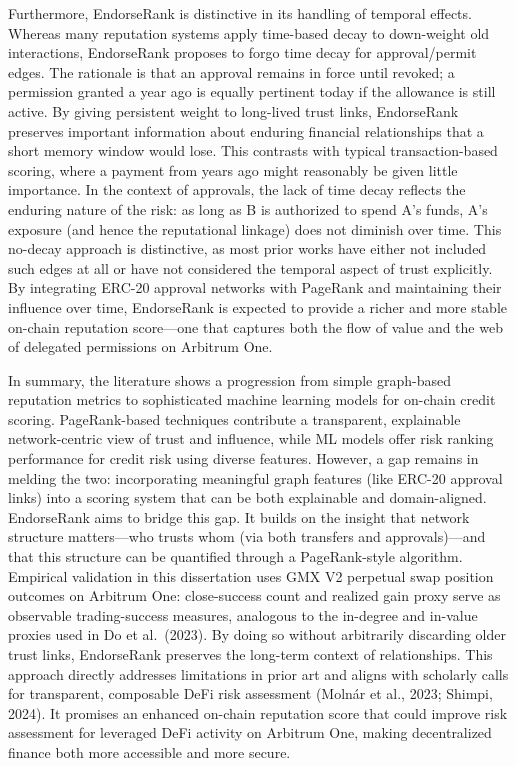 Furthermore, EndorseRank is distinctive in its handling of temporal effects. Whereas many reputation systems apply time-based decay to down-weight old interactions, EndorseRank proposes to forgo time decay for approval/permit edges. The rationale is that an approval remains in force until revoked; a permission granted a year ago is equally pertinent today if the allowance is still active. By giving persistent weight to long-lived trust links, EndorseRank preserves important information about enduring financial relationships that a short memory window would lose. This contrasts with typical transaction-based scoring, where a payment from years ago might reasonably be given little importance. In the context of approvals, the lack of time decay reflects the enduring nature of the risk: as long as B is authorized to spend A's funds, A's exposure (and hence the reputational linkage) does not diminish over time. This no-decay approach is distinctive, as most prior works have either not included such edges at all or have not considered the temporal aspect of trust explicitly. By integrating ERC-20 approval networks with PageRank and maintaining their influence over time, EndorseRank is expected to provide a richer and more stable on-chain reputation score---one that captures both the flow of value and the web of delegated permissions on Arbitrum One.


In summary, the literature shows a progression from simple graph-based reputation metrics to sophisticated machine learning models for on-chain credit scoring. PageRank-based techniques contribute a transparent, explainable network-centric view of trust and influence, while ML models offer risk ranking performance for credit risk using diverse features. However, a gap remains in melding the two: incorporating meaningful graph features (like ERC-20 approval links) into a scoring system that can be both explainable and domain-aligned. EndorseRank aims to bridge this gap. It builds on the insight that network structure matters---who trusts whom (via both transfers and approvals)---and that this structure can be quantified through a PageRank-style algorithm. Empirical validation in this dissertation uses GMX V2 perpetual swap position outcomes on Arbitrum One: close-success count and realized gain proxy serve as observable trading-success measures, analogous to the in-degree and in-value proxies used in Do et al.\ (2023). By doing so without arbitrarily discarding older trust links, EndorseRank preserves the long-term context of relationships. This approach directly addresses limitations in prior art and aligns with scholarly calls for transparent, composable DeFi risk assessment (Moln\'{a}r et al., 2023; Shimpi, 2024). It promises an enhanced on-chain reputation score that could improve risk assessment for leveraged DeFi activity on Arbitrum One, making decentralized finance both more accessible and more secure.
